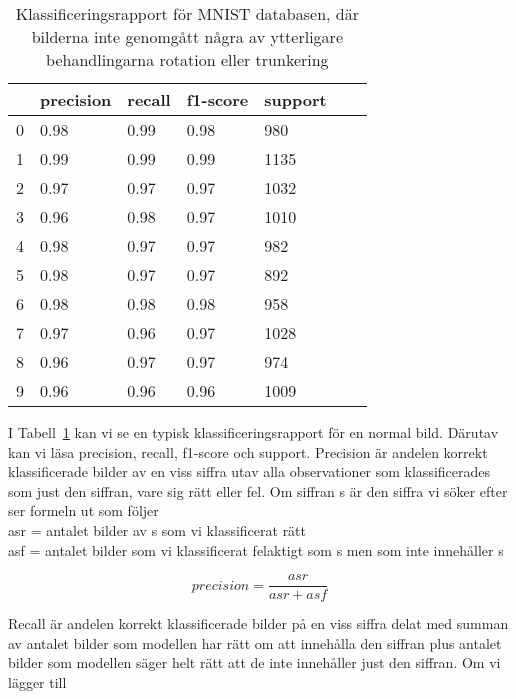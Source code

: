 \documentclass[12pt,a4paper]{article}
\begin{document}
\begin{table}[t]
	\centering
	\footnotesize
	\begin{tabular}{lllllll}
      \hline 
      &     precision &   recall &  f1-score &  support \\
      \hline 
           0   &    0.98  &    0.99 &     0.98    &   980 \\
           1    &   0.99  &    0.99  &    0.99     & 1135 \\
           2    &   0.97  &    0.97  &    0.97     & 1032 \\
           3    &   0.96  &    0.98    &  0.97   &   1010 \\
           4  &     0.98   &   0.97  &    0.97   &    982 \\
           5   &    0.98   &   0.97  &    0.97   &    892 \\
           6   &    0.98 &     0.98   &   0.98   &    958 \\
           7   &    0.97  &    0.96  &    0.97   &   1028 \\
           8   &    0.96   &   0.97  &    0.97   &    974 \\
           9   &   0.96   &   0.96   &   0.96   &   1009 \\
  \end{tabular}
  	\caption{\footnotesize{Klassificeringsrapport för MNIST databasen, där bilderna inte genomgått några av ytterligare behandlingarna rotation eller trunkering}}\label{classification report}\vspace{6pt}
\end{table}

I Tabell~\ref{classification report} kan vi se en typisk klassificeringsrapport för en normal bild. Därutav kan vi läsa precision, recall, f1-score och support. Precision är andelen korrekt klassificerade bilder av en viss siffra utav alla observationer som klassificerades som just den siffran, vare sig rätt eller fel. Om siffran s är den siffra vi söker efter ser formeln ut som följer \\

\noindent
asr = antalet bilder av s som vi klassificerat rätt \\
asf = antalet bilder som vi klassificerat felaktigt som s men som inte innehåller s

\[ precision = \frac{asr}{asr + asf} \]

Recall är andelen korrekt klassificerade bilder på en viss siffra delat med summan av antalet bilder som modellen har rätt om att innehålla den siffran plus antalet bilder som modellen säger helt rätt att de inte innehåller just den siffran. Om vi lägger till \\
\end{document}
